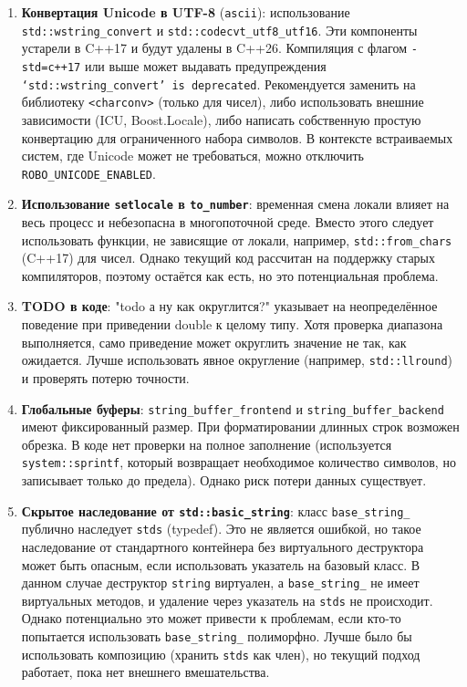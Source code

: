 \documentclass[a4paper,12pt]{article}
\begin{document}
\begin{enumerate}
    \item \textbf{Конвертация Unicode в UTF-8} (\texttt{ascii}): использование \texttt{std::wstring\_convert} и \texttt{std::codecvt\_utf8\_utf16}. Эти компоненты устарели в C++17 и будут удалены в C++26. Компиляция с флагом \texttt{-std=c++17} или выше может выдавать предупреждения \texttt{‘std::wstring\_convert’ is deprecated}. Рекомендуется заменить на библиотеку \texttt{<charconv>} (только для чисел), либо использовать внешние зависимости (ICU, Boost.Locale), либо написать собственную простую конвертацию для ограниченного набора символов. В контексте встраиваемых систем, где Unicode может не требоваться, можно отключить \texttt{ROBO\_UNICODE\_ENABLED}.

    \item \textbf{Использование \texttt{setlocale} в \texttt{to\_number}}: временная смена локали влияет на весь процесс и небезопасна в многопоточной среде. Вместо этого следует использовать функции, не зависящие от локали, например, \texttt{std::from\_chars} (C++17) для чисел. Однако текущий код рассчитан на поддержку старых компиляторов, поэтому остаётся как есть, но это потенциальная проблема.

    \item \textbf{TODO в коде}: "todo а ну как округлится?" указывает на неопределённое поведение при приведении double к целому типу. Хотя проверка диапазона выполняется, само приведение может округлить значение не так, как ожидается. Лучше использовать явное округление (например, \texttt{std::llround}) и проверять потерю точности.

    \item \textbf{Глобальные буферы}: \texttt{string\_buffer\_frontend} и \texttt{string\_buffer\_backend} имеют фиксированный размер. При форматировании длинных строк возможен обрезка. В коде нет проверки на полное заполнение (используется \texttt{system::sprintf}, который возвращает необходимое количество символов, но записывает только до предела). Однако риск потери данных существует.

    \item \textbf{Скрытое наследование от \texttt{std::basic\_string}}: класс \texttt{base\_string\_} публично наследует \texttt{stds} (typedef). Это не является ошибкой, но такое наследование от стандартного контейнера без виртуального деструктора может быть опасным, если использовать указатель на базовый класс. В данном случае деструктор \texttt{string} виртуален, а \texttt{base\_string\_} не имеет виртуальных методов, и удаление через указатель на \texttt{stds} не происходит. Однако потенциально это может привести к проблемам, если кто-то попытается использовать \texttt{base\_string\_} полиморфно. Лучше было бы использовать композицию (хранить \texttt{stds} как член), но текущий подход работает, пока нет внешнего вмешательства.
\end{enumerate}
\end{document}
